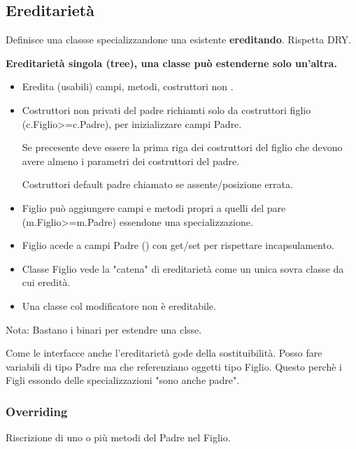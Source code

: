 \subsection{Ereditarietà}
Definisce una classse specializzandone una esistente \textbf{ereditando}. Rispetta DRY.


\textbf{Ereditarietà singola (tree), una classe può estenderne solo un'altra.}

\begin{itemize}
	\item Eredita (usabili) campi, metodi, costruttori non .

	\item Costruttori non privati del padre richiamti solo da costruttori figlio (c.Figlio>=c.Padre), per inizializzare campi Padre.


	Se precesente deve essere la prima riga dei costruttori del figlio che devono avere almeno i parametri dei costruttori del padre.

	Costruttori default padre chiamato se  assente/posizione errata.

	\item Figlio può aggiungere campi e metodi propri a quelli del pare (m.Figlio>=m.Padre) essendone una specializzazione.

	\item Figlio acede a campi Padre () con get/set  per rispettare incapsulamento.

	\item Classe Figlio vede la "catena" di ereditarietà come un unica sovra classe da cui eredità.

	\item Una classe col modificatore  non è ereditabile.
\end{itemize}

Nota: Bastano i binari per estendre una clsse.

Come le interfacce anche l'ereditarietà gode della sostituibilità. Posso fare variabili di tipo Padre ma che referenziano oggetti tipo Figlio. Questo perchè i Figli essondo delle specializzazioni "sono anche padre".

\subsubsection{Overriding}
Riscrizione di uno o più metodi  del Padre nel Figlio.

